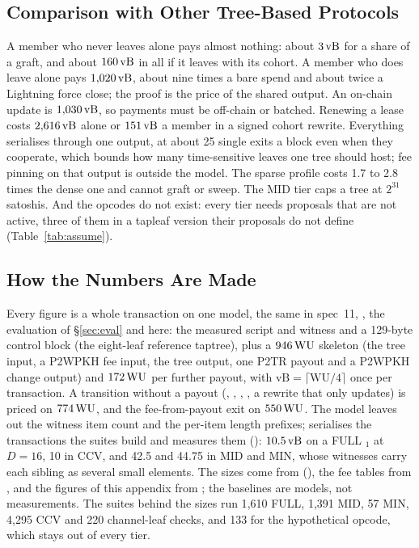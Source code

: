 





\subsection{Comparison with Other Tree-Based Protocols}\label{app:cmp-loses}

A member who never leaves alone pays almost nothing: about $3\,\mathrm{vB}$ for a
share of a graft, and about $160\,\mathrm{vB}$ in all if it leaves with its
cohort. A member
who does leave alone pays $1{,}020\,\mathrm{vB}$, about nine times a bare spend and
about twice a Lightning force close; the proof is the price of the shared
output. An on-chain update is $1{,}030\,\mathrm{vB}$, so payments must be off-chain
or batched. Renewing a lease costs $2{,}616\,\mathrm{vB}$ alone or $151\,\mathrm{vB}$ a
member in a signed cohort rewrite. Everything serialises through one
output, at about 25 single exits a block even when they cooperate,
which bounds how many
time-sensitive leaves one tree should host; fee pinning on that output is
outside the model. The sparse profile costs 1.7 to 2.8 times the dense
one and cannot graft or sweep. The MID tier caps a tree at $2^{31}$
satoshis. And the opcodes do not exist: every tier needs proposals that
are not active, three of them in a tapleaf version their proposals do
not define (Table~\ref{tab:assume}).

\subsection{How the Numbers Are Made}\label{app:cmp-model}

Every figure is a whole transaction on one model, the same in spec~11,
, the evaluation of \S\ref{sec:eval} and
here: the measured script and witness and a 129-byte control block (the
eight-leaf reference taptree), plus a $946\,\mathrm{WU}$ skeleton (the tree input,
a P2WPKH fee input, the tree output, one P2TR payout and a P2WPKH change
output) and $172\,\mathrm{WU}$ per further payout, with
$\mathrm{vB} = \lceil \mathrm{WU}/4 \rceil$ once per transaction. A
transition without a payout (, , ,
, a rewrite that only updates) is priced on $774\,\mathrm{WU}$, and the
fee-from-payout exit on $550\,\mathrm{WU}$. The model leaves out the witness item
count and the per-item length prefixes; 
serialises the transactions the suites build and measures them
(): $10.5\,\mathrm{vB}$ on a FULL $_1$ at
$D = 16$, 10 in CCV, and 42.5 and 44.75 in MID and MIN, whose witnesses
carry each sibling as several small elements. The sizes come from
 (), the fee
tables from , and the figures of this
appendix from ; the baselines are models,
not measurements. The suites behind the sizes run 1{,}610 FULL, 1{,}391 MID,
57 MIN, 4{,}295 CCV and 220 channel-leaf checks, and 133 for the
hypothetical opcode, which stays out of every tier.
